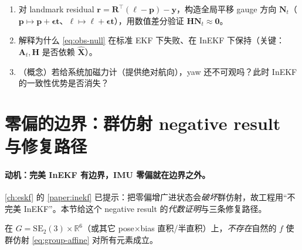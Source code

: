 \begin{practice}
\begin{enumerate}
  \item 对 landmark residual $\mathbf{r}=\mathbf{R}^\top(\boldsymbol{\ell}-\mathbf{p})-\mathbf{y}$，构造全局平移 gauge 方向 $\mathbf{N}_t$（$\mathbf{p}\mapsto\mathbf{p}+\boldsymbol{\epsilon}\mathbf{t}$、$\boldsymbol{\ell}\mapsto\boldsymbol{\ell}+\boldsymbol{\epsilon}\mathbf{t}$），用数值差分验证 $\mathbf{H}\mathbf{N}_t\approx\mathbf{0}$。
  \item 解释为什么 \cref{eq:obs-null} 在标准 EKF 下失败、在 InEKF 下保持（关键：$\mathbf{A}_t,\mathbf{H}$ 是否依赖 $\hat{\mathbf{X}}$）。
  \item （概念）若给系统加磁力计（提供绝对航向），yaw 还不可观吗？此时 InEKF 的一致性优势是否消失？
\end{enumerate}
\end{practice}

\section{零偏的边界：群仿射 negative result 与修复路径}
\label{sec:bias-negative}

\paragraph{动机：完美 InEKF 有边界，IMU 零偏就在边界之外。}
\cref{ch:eskf} 的 \cref{paper:inekf} 已提示：把零偏增广进状态会\emph{破坏}群仿射，故工程用“不完美 InEKF”。本节给这个 negative result 的\emph{代数证明}与三条修复路径。

\begin{theorem}\label{thm:bias-negative}
在 $G=\mathrm{SE}_2(3)\times\mathbb{R}^6$（或其它 pose$\times$bias 直积/半直积）上，\emph{不存在}自然的 $f$ 使群仿射 \cref{eq:group-affine} 对所有元素成立。
\end{theorem}

